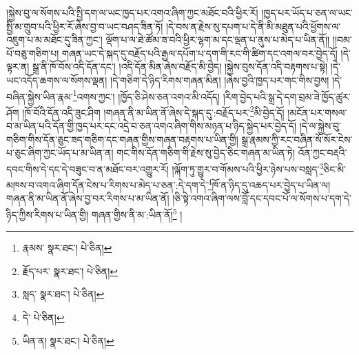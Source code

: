 །སྐྱེས་བུ་ལ་སོགས་པའི་སྤྱི་དག་ལ་ཡང་ཁྱད་པར་འགའ་ཞིག་ཀྱང་མཐོང་བའི་ཕྱིར་རོ། །ཁྱད་པར་ཡོད་པ་ཅན་ལ་ཡང་སྤྱི་མ་གྲུབ་པའི་ཕྱིར་རོ་ཞེས་བྱ་བ་ཡང་བཤད་ཟིན་ཏོ། །དེ་བས་ན་རྗེས་སུ་དཔག་པ་དེ་ནི་མི་མཐུན་པའི་ཕྱོགས་ལ་འཇུག་པ་མ་མཐོང་དུ་ཟིན་ཀྱང་། ལྡོག་པ་ལ་ཐེ་ཚོམ་ཟ་བའི་ཕྱིར་ལྷག་མ་དང་ལྡན་པ་ནུས་པ་མེད་པ་ཡིན་ནོ།། །།བམ་པོ་བཅུ་གཅིག་པ། གཞན་ཡང་དེ་སྐད་དུ་བརྗོད་པའི་རྒྱལ་དཔོག་པ་དག་གི་རང་གི་ཚིག་དང་འགལ་བར་བྱེད་དོ། །དེ་ལྟར་ན། སྒྲ་ནི་ཁོ་བོས་འདི་དོན་དང་། །འདི་དོན་མིན་ཞེས་བརྗོད་མི་བྱེད། །སྐྱེས་བུས་དོན་འདི་བརྟགས་པ་སྟེ། །དེ་ཡང་འདོད་ཆགས་ལ་སོགས་ལྡན། །དེ་གཅིག་དེ་ཉིད་རིགས་གཞན་མིན། །ཞེས་བྱའི་ཁྱད་པར་གང་གིས་བྱས། །དེ་བཞིན་སྐྱེས་ཡིན་རྣམ་\footnote{རྣམས་  སྣར་ཐང་།  པེ་ཅིན། }འགས་ཀྱང་། །ཁྱོད་ཅི་ཤེས་ཅན་འགའ་མི་འདོད། །རིག་བྱེད་པའི་སྒྲ་དེ་དག་བྲམ་ཟེ་ཁྱོད་ཚུར་ཤོག །ཁོ་བོའི་དོན་འདི་ཟུང་ཤིག །གཞན་ནི་མ་ཡིན་ནོ་ཞེས་དེ་སྐད་དུ་:བརྗོད་པར་\footnote{རྗོད་པར་  སྣར་ཐང་།  པེ་ཅིན། }མི་བྱེད་དོ། །མངོན་པར་གསལ་བ་མ་ཡིན་པའི་དོན་གྱི་ཁྱད་པར་དང་འདྲེ་བ་ཅན་འགའ་ཞིག་གིས་མཉན་པ་ཉིད་སྐྱེད་པར་བྱེད་དོ། །དེ་ལ་སྐྱེས་བུ་གཅིག་གིས་དོན་ཅུང་ཟད་གཅིག་དང་གཞན་གྱིས་གཞན་བརྟགས་པ་ཡིན་གྱི། སྒྲ་རྣམས་ཀྱི་རང་བཞིན་སོ་སོར་ངེས་པ་ཅུང་ཞིག་ཀྱང་ཡོད་པ་མ་ཡིན་ན། གང་གིས་དོན་གཅིག་གི་རྗེས་སུ་བྱེད་ཅིང་གཞན་མ་ཡིན་ཏེ། འོན་ཀྱང་བརྡའི་དབང་གིས་དེ་དང་དེ་བཟུང་བ་ན་མཐོང་བར་འགྱུར་རོ། །ལྐོག་ཏུ་གྱུར་བ་གོམས་པའི་ཕྱིར་ཉེས་པས་བསླད་\footnote{སླད་  སྣར་ཐང་།  པེ་ཅིན། }ཅིང་མི་མཁས་བ་འགའ་ཞིག་དོན་ངེས་པ་རིགས་པ་མེད་པ་ཅན་:དེ་དག་དེ་\footnote{དེ་  པེ་ཅིན། }ཁོ་ན་ཉིད་དུ་འཆད་པར་བྱེད་པ་ཡིན་ལ། གཞན་ནི་མ་ཡིན་ནོ་ཞེས་བྱ་བར་རིགས་པ་མ་ཡིན་ནོ། །ཅི་སྟེ་འགའ་ཞིག་ལས་བློ་དང་དབང་པོ་ལ་སོགས་པ་དག་དེ་ཉིད་ཀྱིས་རིགས་པ་ཡིན་གྱི། གཞན་གྱིས་ནི་མ་:ཡིན་ནོ།\footnote{ཡིན་ན།  སྣར་ཐང་།  པེ་ཅིན། } །
